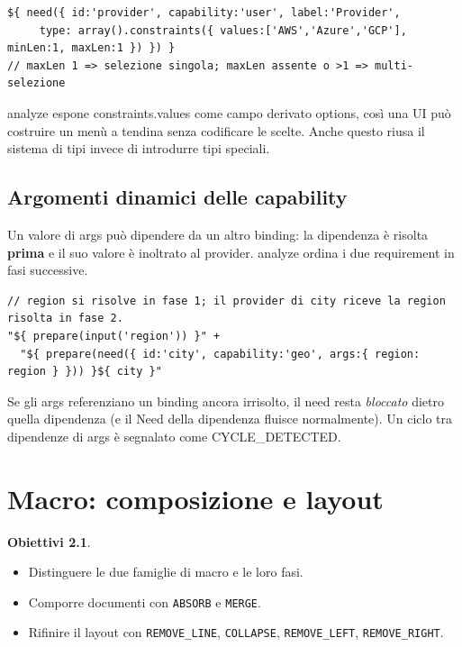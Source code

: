 \documentclass[11pt,a4paper]{book}
\let\code\lstinline
\newcommand{\ic}[1]{{\ttfamily #1}}
\theoremstyle{definition}
\newtheorem*{obiettivi}{Obiettivi}
\begin{document}
{{{{\begin{lstlisting}
${ need({ id:'provider', capability:'user', label:'Provider',
     type: array().constraints({ values:['AWS','Azure','GCP'], minLen:1, maxLen:1 }) }) }
// maxLen 1 => selezione singola; maxLen assente o >1 => multi-selezione
\end{lstlisting}

\ic{analyze} espone \ic{constraints.values} come campo derivato \ic{options}, così
una UI può costruire un menù a tendina senza codificare le scelte. Anche questo
riusa il sistema di tipi invece di introdurre tipi speciali.

\section{Argomenti dinamici delle capability}

Un valore di \ic{args} può dipendere da un altro binding: la dipendenza è risolta
\textbf{prima} e il suo valore è inoltrato al provider. \ic{analyze} ordina i due
requirement in fasi successive.

\begin{lstlisting}
// region si risolve in fase 1; il provider di city riceve la region risolta in fase 2.
"${ prepare(input('region')) }" +
  "${ prepare(need({ id:'city', capability:'geo', args:{ region: region } })) }${ city }"
\end{lstlisting}

Se gli \ic{args} referenziano un binding ancora irrisolto, il need resta
\emph{bloccato} dietro quella dipendenza (e il \ic{Need} della dipendenza fluisce
normalmente). Un ciclo tra dipendenze di \ic{args} è segnalato come
\ic{CYCLE\_DETECTED}.

\chapter{Macro: composizione e layout}
\label{ch:macro}

\begin{obiettivi}
\begin{itemize}
  \item Distinguere le due famiglie di macro e le loro fasi.
  \item Comporre documenti con \code|ABSORB| e \code|MERGE|.
  \item Rifinire il layout con \code|REMOVE_LINE|, \code|COLLAPSE|,
    \code|REMOVE_LEFT|, \code|REMOVE_RIGHT|.
\end{itemize}
\end{obiettivi}

}}}}
\end{document}
